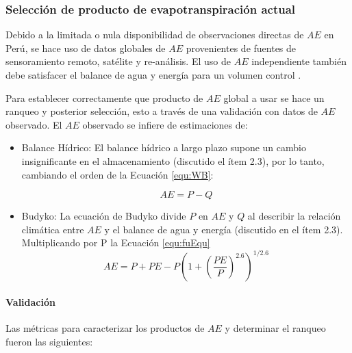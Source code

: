 \documentclass[12pt]{article}
\begin{document}


\subsubsection{Selección de producto de evapotranspiración actual}

Debido a la limitada o nula disponibilidad de observaciones directas de $AE$ en Perú, se hace uso de datos globales de $AE$ provenientes de fuentes de sensoramiento remoto, satélite y re-análisis. El uso de $AE$ independiente también debe satisfacer el balance de agua y energía para un volumen control \citep{Singh2015}.

Para establecer correctamente que producto de $AE$ global a usar se hace un ranqueo y posterior selección, esto a través de una validación con datos de $AE$ observado. El $AE$ observado se infiere de estimaciones de:

\begin{itemize}

	\item Balance Hídrico: El balance hídrico a largo plazo supone un cambio insignificante en el almacenamiento (discutido el ítem 2.3), por lo tanto, cambiando el orden de la Ecuación \ref{equ:WB}:
	
	\begin{equation}
    AE = P - Q
    \label{equ:bheq}
    \end{equation}

	\item Budyko: La ecuación de Budyko divide $P$ en $AE$ y $Q$ al describir la relación climática entre $AE$ y el balance de agua y energía (discutido en el ítem 2.3). Multiplicando por P la Ecuación \ref{equ:fuEqu}
    \begin{equation}
    AE = P + PE - P\left (1 + \left ( \frac{PE}{P} \right )^{2.6}  \right )^{1/2.6}
    \end{equation}
	
\end{itemize}

\paragraph{Validación}\mbox{}

Las métricas para caracterizar los productos de $AE$ y determinar el ranqueo fueron las siguientes:
\end{document}
